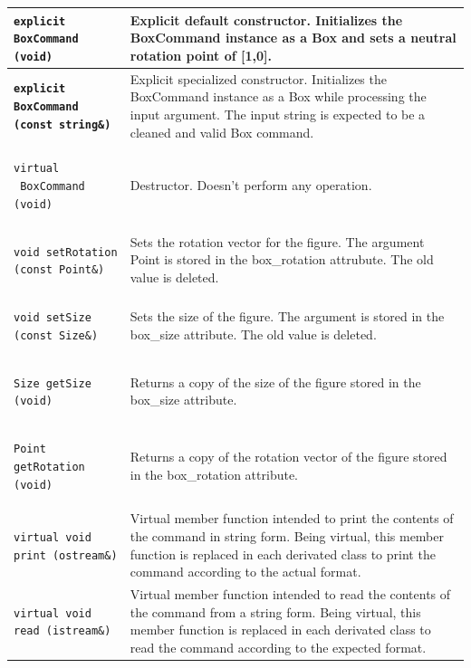 \documentclass[11pt,twoside,openany,x11names,svgnames]{memoir}
\begin{document}
\begin{table}[h]\footnotesize
\centering
\begin{tabular}{| >{\bfseries}p{7.5cm} | p{8cm} |}
	\hline
	
	\texttt{explicit BoxCommand (void)} & Explicit default constructor. Initializes the BoxCommand instance as a Box and sets a neutral rotation point of [1,0]. \\
	
	\hline
	
	\texttt{explicit BoxCommand (const string\&)} & Explicit specialized constructor. Initializes the BoxCommand instance as a Box while processing the input argument. The input string is expected to be a cleaned and valid Box command. \\
	
	\hline
	
	\texttt{virtual ~BoxCommand (void)} & Destructor. Doesn't perform any operation. \\
	
	\hline
	
	\texttt{void setRotation (const Point\&)} & Sets the rotation vector for the figure. The argument Point is stored in the box\_rotation attrubute. The old value is deleted. \\
	
	\hline	
	
	\texttt{void setSize (const Size\&)} & Sets the size of the figure. The argument is stored in the box\_size attribute. The old value is deleted. \\
	
	\hline	
	
	\texttt{Size getSize (void)} & Returns a copy of the size of the figure stored in the box\_size attribute. \\
		
	\hline
	
	\texttt{Point getRotation (void)} & Returns a copy of the rotation vector of the figure stored in the box\_rotation attribute. \\
		
	\hline
	
	\texttt{virtual void print (ostream\&)} & Virtual member function intended to print the contents of the command in string form. Being virtual, this member function is replaced in each derivated class to print the command according to the actual format. \\
	
	\hline
	
	\texttt{virtual void read (istream\&)} & Virtual member function intended to read the contents of the command from a string form. Being virtual, this member function is replaced in each derivated class to read the command according to the expected format. \\
	

\end{tabular}
\end{table}
\end{document}
